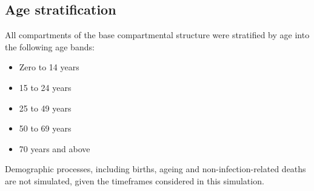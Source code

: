 \subsection{Age stratification}
All compartments of the base compartmental structure were stratified by age into the following age bands:
\begin{itemize}
    \item Zero to 14 years
    \item 15 to 24 years
    \item 25 to 49 years
    \item 50 to 69 years
    \item 70 years and above
\end{itemize}
Demographic processes, including births, ageing and non-infection-related deaths are not simulated, given the timeframes considered in this simulation.
